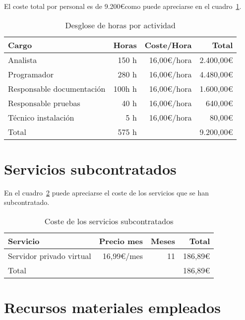 El coste total por personal es de 9.200\euro como puede apreciarse en el cuadro~\ref{tab:des_prec_horas}.

\begin{table}
	\centering
	
	\begin{tabular}{|l|r|r|r|}
		\hline
		Cargo & Horas & Coste/Hora & Total \\
		\hline
		Analista & 150 h & 16,00\euro/hora & 2.400,00\euro\\
		\hline
		Programador & 280 h & 16,00\euro/hora & 4.480,00\euro\\
		\hline
		Responsable documentación & 100h h & 16,00\euro/hora & 1.600,00\euro\\
		\hline
		Responsable pruebas & 40 h & 16,00\euro/hora & 640,00\euro\\
		\hline
		Técnico instalación & 5 h & 16,00\euro/hora & 80,00\euro\\
		\hline
		\hline
		Total & 575 h & \multicolumn{2}{|r|}{9.200,00\euro} \\
		\hline
	\end{tabular}
	\caption{Desglose de horas por actividad}\label{tab:des_prec_horas}
\end{table}


\section{Servicios subcontratados}

En el cuadro~\ref{tab:serv_subcont} puede apreciarse el coste de los servicios que se han subcontratado.

\begin{table}
	\centering
	
	\begin{tabular}{|l|r|r|r|}
		\hline
		Servicio & Precio mes & Meses & Total\\
		\hline
		Servidor privado virtual & 16,99\euro/mes & 11 & 186,89\euro\\
		\hline
		\hline
		\multicolumn{3}{|l|}{Total} & 186,89\euro\\
		\hline
	\end{tabular}
	\caption{Coste de los servicios subcontratados}\label{tab:serv_subcont}
\end{table}

\section{Recursos materiales empleados}

